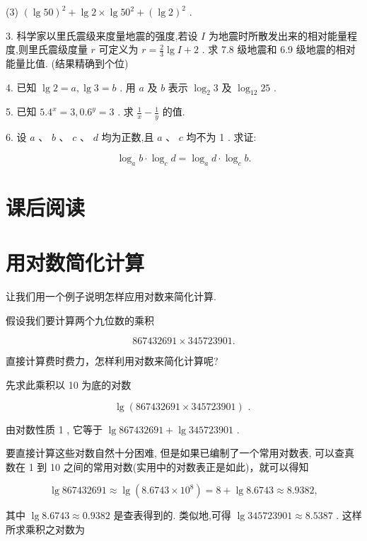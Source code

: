 \documentclass[10pt]{article}
\begin{document}
(3) \({\left( \lg {50}\right) }^{2} + \lg 2 \times  \lg {50}^{2} + {\left( \lg 2\right) }^{2}\) .

3. 科学家以里氏震级来度量地震的强度,若设 \(I\) 为地震时所散发出来的相对能量程度,则里氏震级度量 \(r\) 可定义为 \(r = \frac{2}{3}\lg I + 2\) . 求 7.8 级地震和 6.9 级地震的相对能量比值. (结果精确到个位)

4. 已知 \(\lg 2 = a,\lg 3 = b\) . 用 \(a\) 及 \(b\) 表示 \({\log }_{2}3\) 及 \({\log }_{12}{25}\) .

5. 已知 \({5.4}^{x} = 3,{0.6}^{y} = 3\) . 求 \(\frac{1}{x} - \frac{1}{y}\) 的值.

6. 设 \(a\text{ 、 }b\text{ 、 }c\text{ 、 }d\) 均为正数,且 \(a\text{ 、 }c\) 均不为 1 . 求证:

\[
{\log }_{a}b \cdot  {\log }_{c}d = {\log }_{a}d \cdot  {\log }_{c}b.
\]

\section*{课后阅读}

\section*{用对数简化计算}

让我们用一个例子说明怎样应用对数来简化计算.

假设我们要计算两个九位数的乘积

\[
{867432691} \times  {345723901}.
\]

直接计算费时费力，怎样利用对数来简化计算呢?

先求此乘积以 10 为底的对数

\[
\lg \left( {{867432691} \times  {345723901}}\right) \text{ . }
\]

由对数性质 1 , 它等于 \(\lg {867432691} + \lg {345723901}\) .

要直接计算这些对数自然十分困难, 但是如果已编制了一个常用对数表, 可以查真数在 1 到 10 之间的常用对数(实用中的对数表正是如此)，就可以得知

\[
\lg {867432691} \approx  \lg \left( {{8.6743} \times  {10}^{8}}\right)  = 8 + \lg {8.6743} \approx  {8.9382},
\]

其中 \(\lg {8.6743} \approx  {0.9382}\) 是查表得到的. 类似地,可得 \(\lg {345723901} \approx  {8.5387}\) . 这样所求乘积之对数为



\section*{}
\end{document}
